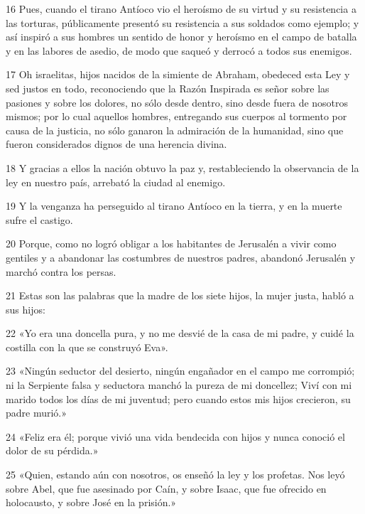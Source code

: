 \par 16 Pues, cuando el tirano Antíoco vio el heroísmo de su virtud y su resistencia a las torturas, públicamente presentó su resistencia a sus soldados como ejemplo; y así inspiró a sus hombres un sentido de honor y heroísmo en el campo de batalla y en las labores de asedio, de modo que saqueó y derrocó a todos sus enemigos.

\par 17 Oh israelitas, hijos nacidos de la simiente de Abraham, obedeced esta Ley y sed justos en todo, reconociendo que la Razón Inspirada es señor sobre las pasiones y sobre los dolores, no sólo desde dentro, sino desde fuera de nosotros mismos; por lo cual aquellos hombres, entregando sus cuerpos al tormento por causa de la justicia, no sólo ganaron la admiración de la humanidad, sino que fueron considerados dignos de una herencia divina.

\par 18 Y gracias a ellos la nación obtuvo la paz y, restableciendo la observancia de la ley en nuestro país, arrebató la ciudad al enemigo.

\par 19 Y la venganza ha perseguido al tirano Antíoco en la tierra, y en la muerte sufre el castigo.

\par 20 Porque, como no logró obligar a los habitantes de Jerusalén a vivir como gentiles y a abandonar las costumbres de nuestros padres, abandonó Jerusalén y marchó contra los persas.

\par 21 Estas son las palabras que la madre de los siete hijos, la mujer justa, habló a sus hijos:

\par 22 «Yo era una doncella pura, y no me desvié de la casa de mi padre, y cuidé la costilla con la que se construyó Eva».

\par 23 «Ningún seductor del desierto, ningún engañador en el campo me corrompió; ni la Serpiente falsa y seductora manchó la pureza de mi doncellez; Viví con mi marido todos los días de mi juventud; pero cuando estos mis hijos crecieron, su padre murió.»

\par 24 «Feliz era él; porque vivió una vida bendecida con hijos y nunca conoció el dolor de su pérdida.»

\par 25 «Quien, estando aún con nosotros, os enseñó la ley y los profetas. Nos leyó sobre Abel, que fue asesinado por Caín, y sobre Isaac, que fue ofrecido en holocausto, y sobre José en la prisión.»

